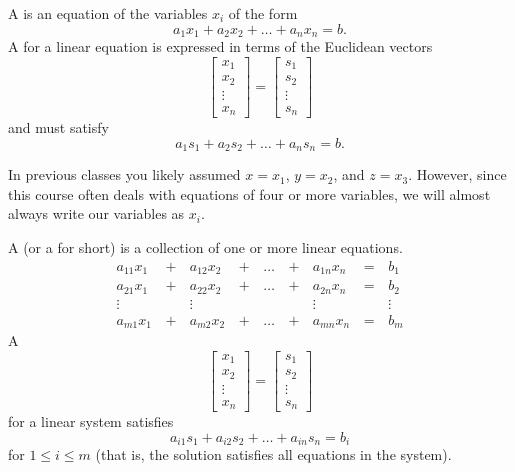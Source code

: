 
\begin{applicationActivities}{1}{3}

\begin{definition}
A  is an equation of the variables \(x_i\) of the form
\[
a_1x_1+a_2x_2+\dots+a_nx_n=b
.\]
A 
for a linear equation is expressed in terms of the Euclidean vectors
\[
  \begin{bmatrix}
    x_1 \\
    x_2 \\
    \vdots \\
    x_n
  \end{bmatrix}=
  \begin{bmatrix}
    s_1 \\
    s_2 \\
    \vdots \\
    s_n
  \end{bmatrix}
\]
and must satisfy
\[
a_1s_1+a_2s_2+\dots+a_ns_n=b
.\]
\end{definition}



\begin{remark}
In previous classes you likely assumed \(x=x_1\), \(y=x_2\), and \(z=x_3\).
However, since this course often deals with equations of four or more
variables, we will almost always write our variables as \(x_i\).
\end{remark}

\begin{definition}
A  (or a  for short)
is a collection of one or more linear equations.
  \begin{alignat*}{5}
    a_{11}x_1 &\,+\,& a_{12}x_2 &\,+\,& \dots  &\,+\,& a_{1n}x_n &\,=\,& b_1 \\
    a_{21}x_1 &\,+\,& a_{22}x_2 &\,+\,& \dots  &\,+\,& a_{2n}x_n &\,=\,& b_2 \\
     \vdots&  &\vdots&   &&  &\vdots&&\vdots  \\
    a_{m1}x_1 &\,+\,& a_{m2}x_2 &\,+\,& \dots  &\,+\,& a_{mn}x_n &\,=\,& b_m
  \end{alignat*}
A 
\[
  \begin{bmatrix}
    x_1 \\
    x_2 \\
    \vdots \\
    x_n
  \end{bmatrix}=
  \begin{bmatrix}
    s_1 \\
    s_2 \\
    \vdots \\
    s_n
  \end{bmatrix}
\]
for a linear system satisfies
\[
a_{i1}s_1+a_{i2}s_2+\dots+a_{in}s_n=b_i
\]
for \(1\leq i\leq m\) (that is, the solution satisfies all equations
in the system).
\end{definition}


\end{applicationActivities}
